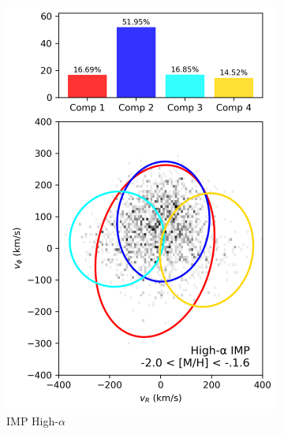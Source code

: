 \documentclass[a4paper,10pt]{article}
\begin{document}
\begin{multicols}{2}
\begin{figure}[H]
  \hfill
  \begin{subfigure}[t]{0.24\linewidth}
    \includegraphics[width=\linewidth]{../figures/gmm_imp_high_alpha_k4.png}
    \caption{IMP High-$\alpha$}
  \end{subfigure}
  \hfill
  \begin{subfigure}[t]{0.24\linewidth}

\end{subfigure}
\end{figure}
\end{multicols}
\end{document}

